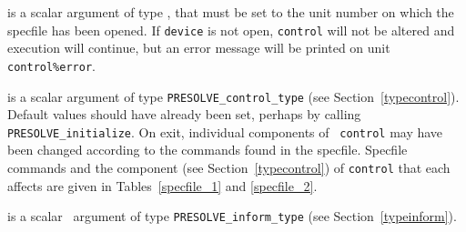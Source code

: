 \documentclass{galahad}
\newcommand{\packagename}{PRESOLVE}
\begin{document}
\begin{description}
 is a scalar \intentin argument of type \integer,
that must be set to the unit number on which the specfile
has been opened. If {\tt device} is not open, {\tt control} will
not be altered and execution will continue, but an error message
will be printed on unit {\tt control\%error}.

 is a scalar \intentinout argument of type
{\tt \packagename\_control\_type} (see Section~\ref{typecontrol}).
Default values should have already been set, perhaps by calling
{\tt \packagename\_initialize}. On exit, individual components of {\tt
control} may have been changed according to the commands found in the
specfile. Specfile commands and  the component (see Section~\ref{typecontrol})
of {\tt control}  that each affects are given in
Tables~\ref{specfile_1} and \ref{specfile_2}.

 is a scalar \intentout\ argument of type
{\tt \packagename\_inform\_type} (see Section~\ref{typeinform}).
\end{description}
\end{document}
